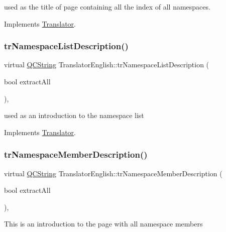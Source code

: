 used as the title of page containing all the index of all namespaces. 

Implements \mbox{\hyperlink{class_translator}{Translator}}.

\mbox{\label{class_translator_english_aefdbb52afa9c6deccbae69697877c646}} 
\subsubsection{\texorpdfstring{trNamespaceListDescription()}{trNamespaceListDescription()}}
{\footnotesize\ttfamily virtual \mbox{\hyperlink{class_q_c_string}{Q\+C\+String}} Translator\+English\+::tr\+Namespace\+List\+Description (\begin{DoxyParamCaption}\item[{bool}]{extract\+All }\end{DoxyParamCaption})\hspace{0.3cm}{\ttfamily [inline]}, {\ttfamily [virtual]}}

used as an introduction to the namespace list 

Implements \mbox{\hyperlink{class_translator}{Translator}}.

\mbox{\label{class_translator_english_a9c5d3605a9c33fa40e73fa5cc57f5a6e}} 
\subsubsection{\texorpdfstring{trNamespaceMemberDescription()}{trNamespaceMemberDescription()}}
{\footnotesize\ttfamily virtual \mbox{\hyperlink{class_q_c_string}{Q\+C\+String}} Translator\+English\+::tr\+Namespace\+Member\+Description (\begin{DoxyParamCaption}\item[{bool}]{extract\+All }\end{DoxyParamCaption})\hspace{0.3cm}{\ttfamily [inline]}, {\ttfamily [virtual]}}

This is an introduction to the page with all namespace members 

